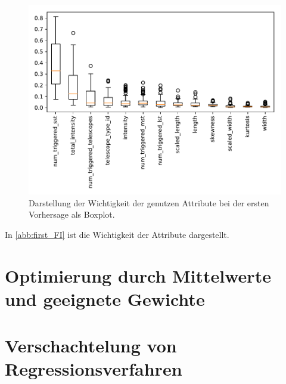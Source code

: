 \begin{figure}
  \includegraphics{Plots/feautureimportance_boxplot_trafo_firstForest.pdf}
  \caption{Darstellung der Wichtigkeit der genutzen Attribute bei der ersten Vorhersage als Boxplot.}
  \label{abb:first_FI}
\end{figure}

In \autoref{abb:first_FI} ist die Wichtigkeit der Attribute dargestellt.

\section{Optimierung durch Mittelwerte und geeignete Gewichte}


\section{Verschachtelung von Regressionsverfahren}

